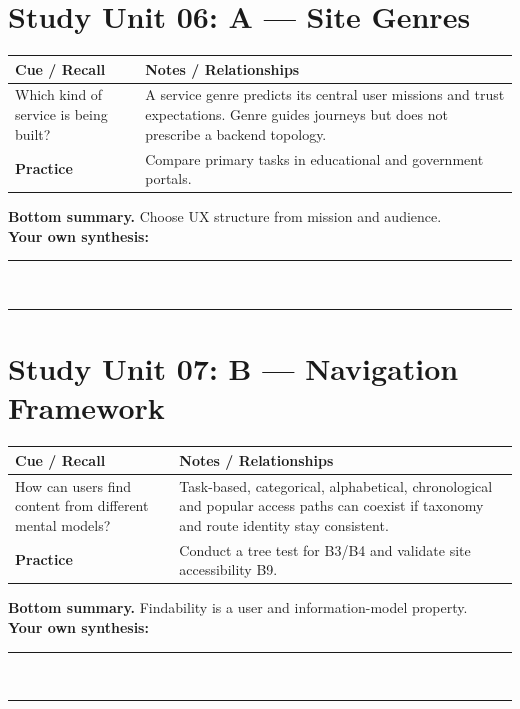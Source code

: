 \documentclass[11pt]{article}
\begin{document}
\section{Study Unit 06: A — Site Genres}
\begin{longtable}{@{}p{.27\linewidth}p{.66\linewidth}@{}}\toprule
\textbf{Cue / Recall} & \textbf{Notes / Relationships}\\\midrule\endhead
Which kind of service is being built? & A service genre predicts its central user missions and trust expectations. Genre guides journeys but does not prescribe a backend topology.\\
\addlinespace[4mm]
\textbf{Practice} & Compare primary tasks in educational and government portals.\\\bottomrule\end{longtable}
\begin{dosnotebox}\textbf{Bottom summary.} Choose UX structure from mission and audience.\\[2mm]
\textbf{Your own synthesis:} \rule{.72\linewidth}{.4pt}\\[4mm]
\rule{.96\linewidth}{.4pt}\end{dosnotebox}

\section{Study Unit 07: B — Navigation Framework}
\begin{longtable}{@{}p{.27\linewidth}p{.66\linewidth}@{}}\toprule
\textbf{Cue / Recall} & \textbf{Notes / Relationships}\\\midrule\endhead
How can users find content from different mental models? & Task-based, categorical, alphabetical, chronological and popular access paths can coexist if taxonomy and route identity stay consistent.\\
\addlinespace[4mm]
\textbf{Practice} & Conduct a tree test for B3/B4 and validate site accessibility B9.\\\bottomrule\end{longtable}
\begin{dosnotebox}\textbf{Bottom summary.} Findability is a user and information-model property.\\[2mm]
\textbf{Your own synthesis:} \rule{.72\linewidth}{.4pt}\\[4mm]
\rule{.96\linewidth}{.4pt}\end{dosnotebox}
\end{document}
